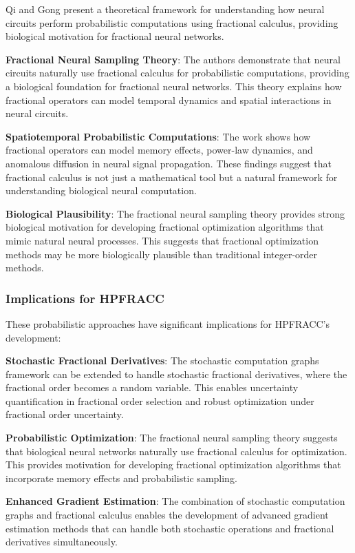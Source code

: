 Qi and Gong \cite{qi2022fractional} present a theoretical framework for understanding how neural circuits perform probabilistic computations using fractional calculus, providing biological motivation for fractional neural networks.

\textbf{Fractional Neural Sampling Theory}: The authors demonstrate that neural circuits naturally use fractional calculus for probabilistic computations, providing a biological foundation for fractional neural networks. This theory explains how fractional operators can model temporal dynamics and spatial interactions in neural circuits.

\textbf{Spatiotemporal Probabilistic Computations}: The work shows how fractional operators can model memory effects, power-law dynamics, and anomalous diffusion in neural signal propagation. These findings suggest that fractional calculus is not just a mathematical tool but a natural framework for understanding biological neural computation.

\textbf{Biological Plausibility}: The fractional neural sampling theory provides strong biological motivation for developing fractional optimization algorithms that mimic natural neural processes. This suggests that fractional optimization methods may be more biologically plausible than traditional integer-order methods.

\subsubsection{Implications for HPFRACC}

These probabilistic approaches have significant implications for HPFRACC's development:

\textbf{Stochastic Fractional Derivatives}: The stochastic computation graphs framework can be extended to handle stochastic fractional derivatives, where the fractional order becomes a random variable. This enables uncertainty quantification in fractional order selection and robust optimization under fractional order uncertainty.

\textbf{Probabilistic Optimization}: The fractional neural sampling theory suggests that biological neural networks naturally use fractional calculus for optimization. This provides motivation for developing fractional optimization algorithms that incorporate memory effects and probabilistic sampling.

\textbf{Enhanced Gradient Estimation}: The combination of stochastic computation graphs and fractional calculus enables the development of advanced gradient estimation methods that can handle both stochastic operations and fractional derivatives simultaneously.

